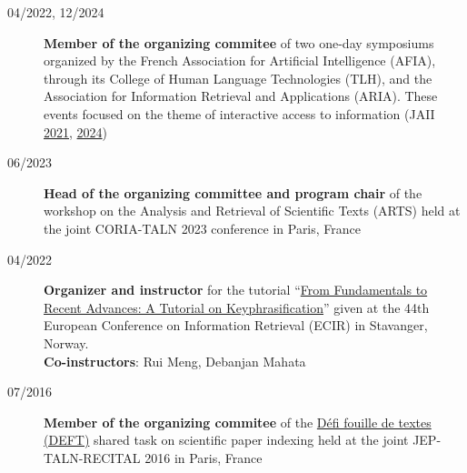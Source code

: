 \begin{description}

    \item[04/2022, 12/2024] \textbf{Member of the organizing commitee} of two one-day symposiums organized by the French Association for Artificial Intelligence (AFIA), through its College of Human Language Technologies (TLH), and the Association for Information Retrieval and Applications (ARIA). These events focused on the theme of interactive access to information (JAII \href{https://jaii2021.sciencesconf.org/}{2021}, \href{https://jaii2024.sciencesconf.org/}{2024})

    \item[06/2023] \textbf{Head of the organizing committee and program chair} of the workshop on the Analysis and Retrieval of Scientific Texts (ARTS) held at the joint CORIA-TALN 2023 conference in Paris, France

    \item[04/2022] \textbf{Organizer and instructor} for the tutorial ``\href{https://keyphrasification.github.io/}{From Fundamentals to Recent Advances: A Tutorial on Keyphrasification}'' given at the 44th European Conference on Information Retrieval (ECIR) in Stavanger, Norway. \\
    \textbf{Co-instructors}: Rui Meng, Debanjan Mahata

    \item[07/2016] \textbf{Member of the organizing commitee} of the \href{https://talnarchives.atala.org/ateliers/2016/DEFT/1.pdf}{Défi fouille de textes (DEFT)} shared task on scientific paper indexing held at the joint JEP-TALN-RECITAL 2016 in Paris, France


\end{description}
